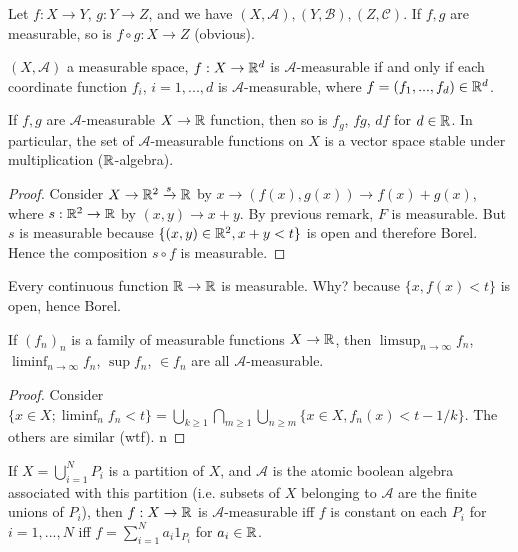 \documentclass[a4paper]{article}
\begin{document}
\begin{rem}
Let $f:X \to Y$, $g:Y \to Z$, and we have $(X,\mathcal{A}),(Y,\mathcal{B}),(Z,\mathcal{C})$. If $f,g$ are measurable, so is $f \circ g: X \to Z$ (obvious).
\end{rem}

\begin{rem}
$(X,\mathcal{A})$ a measurable space, $f:X \to \mathbb{R}^d$ is $\mathcal{A}$-measurable if and only if each coordinate function $f_i$, $i=1,...,d$ is $\mathcal{A}$-measurable, where $f=(f_1,...,f_d) \in \mathbb{R}^d$.
\end{rem}

\begin{prop}
If $f,g$ are $\mathcal{A}$-measurable $X \to \mathbb{R}$ function, then so is $f_g$, $fg$, $d f$ for $d \in \mathbb{R}$. In particular, the set of $\mathcal{A}$-measurable functions on $X$ is a vector space stable under multiplication ($\mathbb{R}$-algebra).
\begin{proof}
Consider $X \to \mathbb{R}^2 \xrightarrow{s} \mathbb{R}$ by $x \to (f(x),g(x)) \to f(x)+g(x)$, where $s:\mathbb{R}^2 \to \mathbb{R}$ by $(x,y) \to x+y$. By previous remark, $F$ is measurable. But $s$ is measurable because $\{(x,y) \in \mathbb{R}^2, x+y < t\}$ is open and therefore Borel. Hence the composition $s \circ f$ is measurable.
\end{proof}
\end{prop}

\begin{rem}
Every continuous function $\mathbb{R} \to \mathbb{R}$ is measurable. Why? because $\{x,f(x) < t\}$ is open, hence Borel. 
\end{rem}

\begin{prop}
If $(f_n)_n$ is a family of measurable functions $X \to \mathbb{R}$, then $\limsup_{n \to \infty} f_n$, $\liminf_{n\to \infty}f_n$, $\sup f_n$, $\in f_n$ are all $\mathcal{A}$-measurable.
\begin{proof}
Consider $\{x \in X; \liminf_n f_n < t\} = \bigcup_{k \geq 1} \bigcap_{m \geq 1} \bigcup_{n \geq m} \{x \in X, f_n(x) < t-1/k\}$. The others are similar (wtf). n
\end{proof}
\end{prop}

\begin{rem}
If $X = \bigcup_{i=1}^N P_i$ is a partition of $X$, and $\mathcal{A}$ is the atomic boolean algebra associated with this partition (i.e. subsets of $X$ belonging to $\mathcal{A}$ are the finite unions of $P_i$), then $f:X \to \mathbb{R}$ is $\mathcal{A}$-measurable iff $f$ is constant on each $P_i$ for $i=1,...,N$ iff $f = \sum_{i=1}^N a_i 1_{P_i}$ for $a_i \in \mathbb{R}$.
\end{rem}
\end{document}
